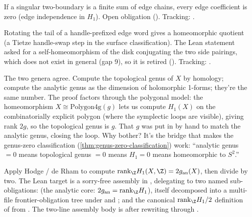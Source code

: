 \begin{lemma}
\label{lem:edge-chain-sum-singular-boundary-scalar-coefficient-zero}
If a singular two-boundary is a finite sum of edge chains, every edge
coefficient is zero (edge independence in \(H_1\)). Open obligation
().
Tracking: .
\end{lemma}

\begin{lemma}
\label{lem:handleprefix-tailrotate-homeomorph}
Rotating the tail of a handle-prefixed edge word gives a homeomorphic quotient
(a Tietze handle-swap step in the surface classification). The Lean statement asked
for a self-homeomorphism of the disk conjugating the two side pairings, which does not
exist in general (gap 9), so it is retired ().
Tracking: .
\end{lemma}

\begin{layman}
The two genera agree. Compute the topological genus of \(X\) by
homology; compute the analytic genus as the dimension of
holomorphic 1-forms; they're the same number. The proof factors
through the polygonal model: the homeomorphism \(X\cong
\mathrm{Polygon4g}(g)\) lets us compute \(H_1(X)\) on the
combinatorially explicit polygon (where the symplectic loops are
visible), giving rank \(2g\), so the topological genus is \(g\).
That \(g\) was put in by hand to match the analytic genus, closing
the loop. Why bother? It's the bridge that makes the
genus-zero classification (\ref{thm:genus-zero-classification})
work: ``analytic genus \(=0\) means topological genus \(=0\) means
\(H_1=0\) means homeomorphic to \(S^2\).''
\end{layman}

\begin{proofsketch}
Apply Hodge / de Rham to compute \(\mathrm{rank}_\Z H_1(X,\Z) = 2 g_{\mathrm{an}}(X)\),
then divide by two. The Lean target
is a sorry-free assembly in
, delegating to two
named sub-obligations:  (the analytic
core: \(2g_{\mathrm{an}} = \mathrm{rank}_\Z H_1\)), itself
decomposed into a multi-file frontier-obligation tree under
 and
; and the canonical
\(\mathrm{rank}_\Z H_1 / 2\) definition of 
from . The two-line
assembly body is  after rewriting through
.
\end{proofsketch}

